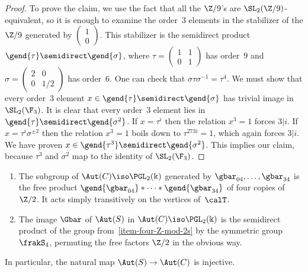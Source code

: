 \begin{proof}
To prove the claim, we use the fact that all the $\Z/9$'s are $\SL_2(\Z/9)$-equivalent, so it is enough to examine the order~$3$ elements in the stabilizer of the $\Z/9$ generated by $(
\begin{smallmatrix}1\\0
\end{smallmatrix})$.
This stabilizer is the semidirect product $\gend{\tau}\semidirect\gend{\sigma}$, where $\tau=(
\begin{smallmatrix}1&1\\0&1
\end{smallmatrix})$ has order~$9$ and
$\sigma=(
\begin{smallmatrix}2&0\\0&1/2
\end{smallmatrix})$ has order~$6$.
One can check that $\sigma\tau\sigma^{-1}=\tau^4$. We must show that every order~$3$ element $x\in\gend{\tau}\semidirect\gend{\sigma}$ has trivial image in $\SL_2(\F_3)$. It is clear that every order~$3$ element lies in $\gend{\tau}\semidirect\gend{\sigma^2}$. If $x=\tau^i$ then the relation $x^3=1$ forces $3|i$. If $x=\tau^i\sigma^{\pm2}$ then the relation $x^3=1$ boils down to $\tau^{273i}=1$, which again forces $3|i$. We have proven $x\in\gend{\tau^3}\semidirect\gend{\sigma^2}$. This implies our claim, because $\tau^3$ and $\sigma^2$ map to the identity of $\SL_2(\F_3)$.
\end{proof}

\begin{theo}\label{thm3.6}
\label{thm-descriptions-of-G}
\leavevmode
\begin{enumerate}
\item \label{item-four-Z-mod-2s}
The subgroup of $\Aut(C)\iso\PGL_2(\Bbbk)$ generated by $\gbar_{04},\dots,\gbar_{34}$ is the free product $\gend{\gbar_{04}}*\cdots*\gend{\gbar_{34}}$ of four copies of~$\Z/2$. It acts simply transitively on the vertices of~$\calT$.
\item \label{item-description-of-G}
The image $\Gbar$ of $\Aut(S)$ in $\Aut(C)\iso\PGL_2(\Bbbk)$ is the semidirect product of the group from~\eqref{item-four-Z-mod-2s} by the symmetric group~$\frakS_4$, permuting the free factors $\Z/2$ in the obvious way.
\end{enumerate}
In particular, the natural map $\Aut(S)\to\Aut(C)$ is injective.
\end{theo}

